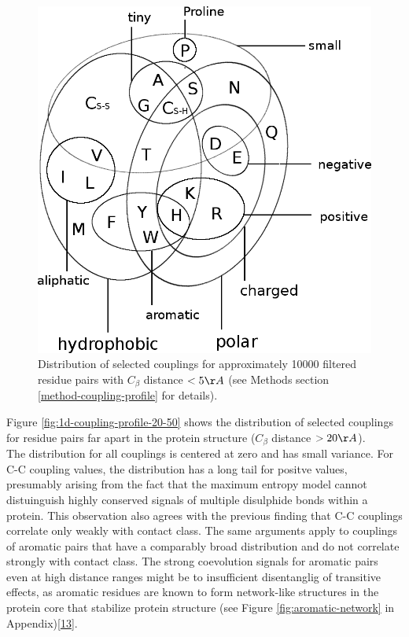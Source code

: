 \documentclass[12pt,a4paper,twoside]{book}
\newcommand{\Cb}{C_\beta}
\theoremstyle{definition}
\theoremstyle{definition}
\theoremstyle{remark}
\begin{document}
\begin{figure}
\includegraphics[width=1\linewidth]{img/amino_acid_physico_chemical_properties_venn_diagramm} \caption{Distribution of selected
couplings for approximately 10000 filtered residue pairs with \(\Cb\)
distance \(< 5\AA\) (see Methods section \ref{method-coupling-profile}
for details).}\label{fig:1d-coupling-profile-8-12}
\end{figure}

Figure \ref{fig:1d-coupling-profile-20-50} shows the distribution of
selected couplings for residue pairs far apart in the protein structure
(\(\Cb\) distance \(> 20\AA\)).\\
The distribution for all couplings is centered at zero and has small
variance. For C-C coupling values, the distribution has a long tail for
positve values, presumably arising from the fact that the maximum
entropy model cannot distuinguish highly conserved signals of multiple
disulphide bonds within a protein. This observation also agrees with the
previous finding that C-C couplings correlate only weakly with contact
class. The same arguments apply to couplings of aromatic pairs that have
a comparably broad distribution and do not correlate strongly with
contact class. The strong coevolution signals for aromatic pairs even at
high distance ranges might be to insufficient disentanglig of transitive
effects, as aromatic residues are known to form network-like structures
in the protein core that stabilize protein structure (see Figure
\ref{fig:aromatic-network} in
Appendix){[}\protect\hyperlink{ref-Burley1985}{13}{]}.
\end{document}
